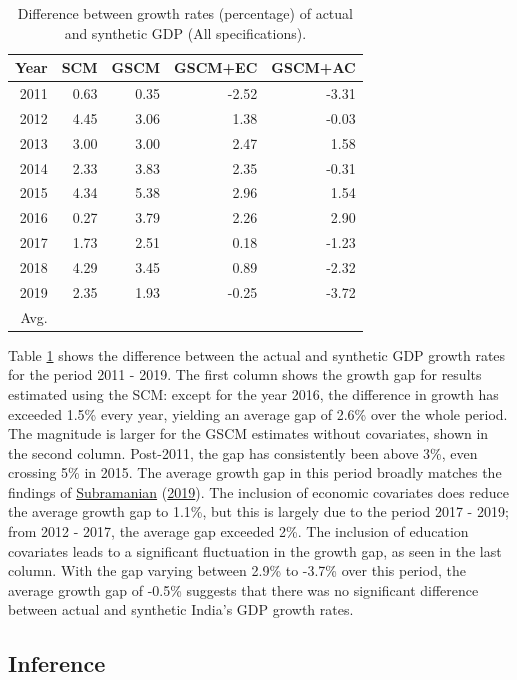 \documentclass[12pt,nobind, a4paper]{reedthesis}
\begin{document}
 \begin{table}[h!!]
 \centering
 \begin{tabular}{rrrrr}
 \hline
 \B Year & \B SCM & \B GSCM & \B GSCM+EC & \B GSCM+AC\\
 \hline
 2011 & 0.63 & 0.35 & -2.52 & -3.31\\
 \hline
 2012 & 4.45 & 3.06 & 1.38 & -0.03\\
 \hline
 2013 & 3.00 & 3.00 & 2.47 & 1.58\\
 \hline
 2014 & 2.33 & 3.83 & 2.35 & -0.31\\
 \hline
 2015 & 4.34 & 5.38 & 2.96 & 1.54\\
 \hline
 2016 & 0.27 & 3.79 & 2.26 & 2.90\\
 \hline
 2017 & 1.73 & 2.51 & 0.18 & -1.23\\
 \hline
 2018 & 4.29 & 3.45 & 0.89 & -2.32\\
 \hline
 2019 & 2.35 & 1.93 & -0.25 & -3.72\\
 \hline
 \B Avg. & \B 2.6 & \B 3.0 & \B 1.1& \B -0.5\\
 \hline
 \end{tabular}
 \caption{Difference between growth rates (percentage) of actual and synthetic GDP (All specifications).}
 \label{tab:t32}
 \end{table}
 Table \ref{tab:t32} shows the difference between the actual and synthetic GDP growth rates for the period 2011 - 2019. The first column shows the growth gap for results estimated using the SCM: except for the year 2016, the difference in growth has exceeded 1.5\% every year, yielding an average gap of 2.6\% over the whole period. The magnitude is larger for the GSCM estimates without covariates, shown in the second column. Post-2011, the gap has consistently been above 3\%, even crossing 5\% in 2015. The average growth gap in this period broadly matches the findings of \protect\hyperlink{ref-subramanian_indias_2019}{Subramanian} (\protect\hyperlink{ref-subramanian_indias_2019}{2019}). The inclusion of economic covariates does reduce the average growth gap to 1.1\%, but this is largely due to the period 2017 - 2019; from 2012 - 2017, the average gap exceeded 2\%. The inclusion of education covariates leads to a significant fluctuation in the growth gap, as seen in the last column. With the gap varying between 2.9\% to -3.7\% over this period, the average growth gap of -0.5\% suggests that there was no significant difference between actual and synthetic India's GDP growth rates.

 \hypertarget{inference-1}{%
 \subsection{Inference}\label{inference-1}}
\end{document}
